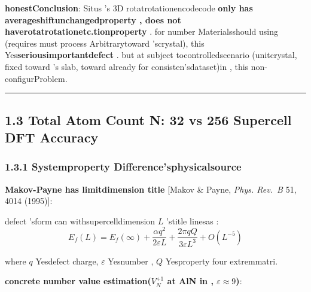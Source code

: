 \documentclass[
  12pt,
]{article}
\begin{document}
\textbf{honestConclusion}: Situs 's 3D
rotatrotationencodecode \textbf{only has averageshiftunchangedproperty , does not haverotatrotationetc.tionproperty }. for number Materialsshould using (requires must process Arbitrarytoward 'scrystal), this Yes\textbf{seriousimportantdefect }. but at subject tocontrolledscenario (unitcrystal, fixed toward 's
slab, toward already for consisten'sdataset)in , this non-configurProblem. 

\begin{center}\rule{0.5\linewidth}{0.5pt}\end{center}

\subsection{1.3 Total Atom Count N: 32 vs 256 Supercell DFT
Accuracy}\label{ux539fux5b50ux603bux6570-n32-vs-256-ux8d85ux80deux7684-dft-ux7cbeux5ea6}

\subsubsection{1.3.1
Systemproperty Difference'sphysicalsource }\label{ux7cfbux7edfux6027ux5deeux5f02ux7684ux7269ux7406ux8d77ux6e90}

\textbf{Makov-Payne has limitdimension title } {[}Makov \& Payne, \emph{Phys. Rev.~B}
51, 4014 (1995){]}: 

 defect 'sform can withsupercelldimension  \(L\) 'stitle linesas : 
\[E_f(L) = E_f(\infty) + \frac{\alpha q^2}{2\varepsilon L} + \frac{2\pi q Q}{3\varepsilon L^3} + O(L^{-5})\]

where \(q\) Yesdefect charge, \(\varepsilon\) Yesnumber , \(Q\) Yesproperty four extremmatri. 

\textbf{concrete number value estimation(\(V_N^{+1}\) at  AlN
in , \(\varepsilon \approx 9\))}: 
\end{document}
